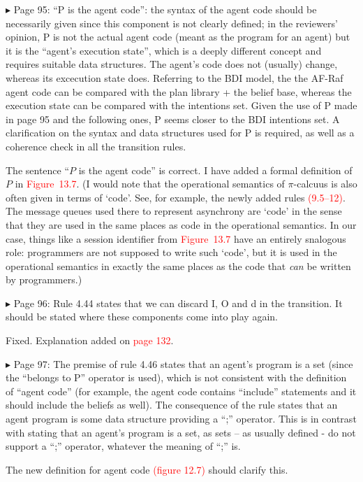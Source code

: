 \documentclass{article}
\newcommand*\R[1]{\textcolor{red}{#1}} %
\newenvironment{them}%
  {\bigskip\noindent\begingroup\color{blue}$\blacktriangleright$\enspace}%
  {\endgroup\par}
\begin{document}
\begin{them}
Page 95:
``P is the agent code'': the syntax of the agent code should be necessarily given
since this component is not clearly defined; in the reviewers' opinion, P is
not the actual agent code (meant as the program for an agent) but it is the
``agent's execution state'', which is a deeply different concept and requires
suitable data structures. The agent's code does not (usually) change, whereas
its excecution state does. Referring to the BDI model, the the AF-Raf agent
code can be compared with the plan library + the belief base, whereas the
execution state can be compared with the intentions set. Given the use of P
made in page 95 and the following ones, P seems closer to the BDI intentions
set. A clarification on the syntax and data structures used for P is required,
as well as a coherence check in all the transition rules.
\end{them}
The sentence ``$P$ is the agent code'' is correct.
I have added a formal definition of $P$ in \R{Figure~13.7}.
(I would note that the operational semantics of $\pi$-calcuus is also
  often given in terms of `code'.
See, for example, the newly added rules \R{(9.5--12)}.
The message queues used there to represent asynchrony are `code'
  in the sense that they are used in the same places as code in the operational semantics.
In our case, things like a session identifier from \R{Figure~13.7}
  have an entirely snalogous role:
  programmers are not supposed to write such `code',
  but it is used in the operational semantics in exactly the same
    places as the code that \emph{can} be written by programmers.)


\begin{them}
Page 96:
Rule 4.44 states that we can discard I, O and d in the transition. It should be
stated where these components come into play again.
\end{them}
Fixed. Explanation added on \R{page 132}.

\begin{them}
Page 97:
The premise of rule 4.46 states that an agent's program is a set (since the
``belongs to P'' operator is used), which is not consistent with the definition
of ``agent code'' (for example, the agent code contains ``include'' statements and
it should include the beliefs as well). The consequence of the rule states that
an agent program is some data structure providing a ``;'' operator. This is in
contrast with stating that an agent's program is a set, as sets – as usually
defined - do not support a ``;'' operator, whatever the meaning of ``;'' is.
\end{them}
The new definition for agent code \R{(figure 12.7)} should clarify this.
\end{document}
